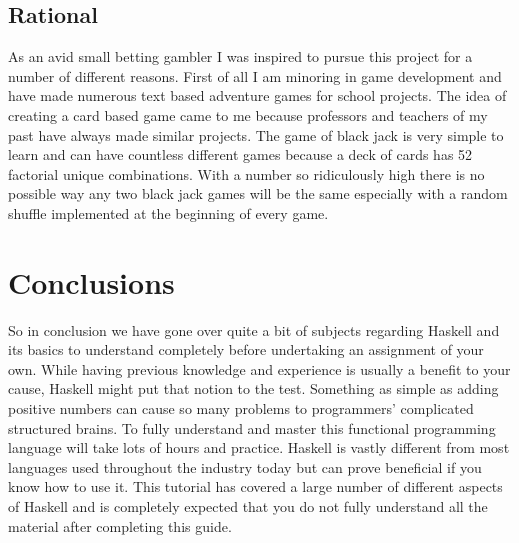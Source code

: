 \documentclass{article}
\begin{document}
    \subsection{Rational}
    As an avid small betting gambler I was inspired to pursue this project for a number of different reasons. First of all I am minoring in game development and have made numerous text based adventure games for school projects. The idea of creating a card based game came to me because professors and teachers of my past have always made similar projects. The game of black jack is very simple to learn and can have countless different games because a deck of cards has 52 factorial unique combinations. With a number so ridiculously high there is no possible way any two black jack games will be the same especially with a random shuffle implemented at the beginning of every game. 
    
    
\section{Conclusions}\label{conclusions}

So in conclusion we have gone over quite a bit of subjects regarding Haskell and its basics to understand completely before undertaking an assignment of your own. While having previous knowledge and experience is usually a benefit to your cause, Haskell might put that notion to the test. Something as simple as adding positive numbers can cause so many problems to programmers' complicated structured brains. To fully understand and master this functional programming language will take lots of hours and practice. Haskell is vastly different from most languages used throughout the industry today but can prove beneficial if you know how to use it. This tutorial has covered a large number of different aspects of Haskell and is completely expected that you do not fully understand all the material after completing this guide.
\end{document}
